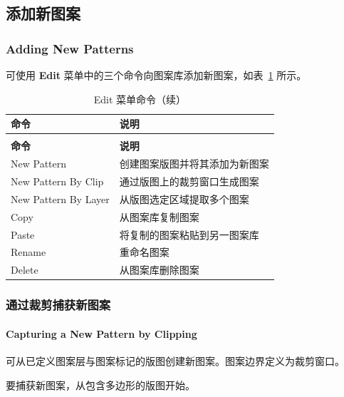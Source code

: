 
\subsection{添加新图案}
\subsubsection*{Adding New Patterns}

可使用 \textbf{Edit} 菜单中的三个命令向图案库添加新图案，如表~\ref{tab:plm-edit-menu} 所示。

\begin{longtable}{@{}p{} p{}@{}}
\caption{Edit 菜单命令}\label{tab:plm-edit-menu}\\
\toprule
\textbf{命令} & \textbf{说明} \\
\midrule
\endfirsthead
\caption[]{Edit 菜单命令（续）}\\
\toprule
\textbf{命令} & \textbf{说明} \\
\midrule
\endhead
\bottomrule
\endfoot
New Pattern
  & 创建图案版图并将其添加为新图案 \\
New Pattern By Clip
  & 通过版图上的裁剪窗口生成图案 \\
New Pattern By Layer
  & 从版图选定区域提取多个图案 \\
Copy
  & 从图案库复制图案 \\
Paste
  & 将复制的图案粘贴到另一图案库 \\
Rename
  & 重命名图案 \\
Delete
  & 从图案库删除图案 \\
\end{longtable}

\subsubsection{通过裁剪捕获新图案}
\paragraph*{Capturing a New Pattern by Clipping}

可从已定义图案层与图案标记的版图创建新图案。图案边界定义为裁剪窗口。

要捕获新图案，从包含多边形的版图开始。

